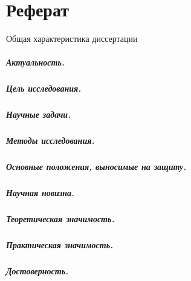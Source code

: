 \renewcommand{\figurename}{Рисунок}
\renewcommand{\tablename}{Таблица}
\renewcommand\thesubfigure{\asbuk{subfigure}}
\chapter*{Реферат}

\begin{center}
    Общая характеристика диссертации
\end{center}

\paragraph*{Актуальность.}

\paragraph*{Цель исследования.}
\paragraph*{Научные задачи.}

\paragraph*{Методы исследования.}

\paragraph*{Основные положения, выносимые на защиту.}


\paragraph*{Научная новизна.}

\paragraph*{Теоретическая значимость.}
\paragraph*{Практическая значимость.}
\paragraph*{Достоверность.}
